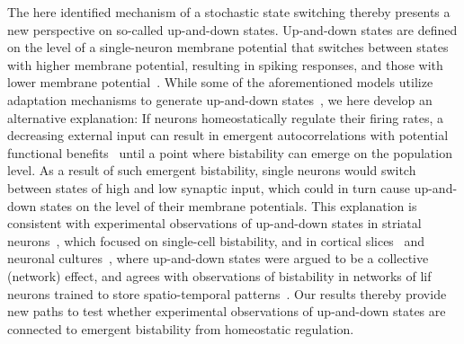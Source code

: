 The here identified mechanism of a stochastic state switching thereby presents a new perspective on so-called up-and-down states.
Up-and-down states are defined on the level of a single-neuron membrane potential that switches between states with higher membrane potential, resulting in spiking responses, and those with lower membrane potential~\cite{wilson_up_2008}.
While some of the aforementioned models utilize adaptation mechanisms to generate up-and-down states~\cite{millman_self-organized_2010,di_santo_self-organized_2016, buendia_self-organized_2020}, we here develop an alternative explanation:
If neurons homeostatically regulate their firing rates, a decreasing external input can result in emergent autocorrelations with potential functional benefits~\cite{zierenberg_homeostatic_2018, cramer_control_2020} until a point where bistability can emerge on the population level.
As a result of such emergent bistability, single neurons would switch between states of high and low synaptic input, which could in turn cause up-and-down states on the level of their membrane potentials.
This explanation is consistent with experimental observations of up-and-down states in striatal neurons~\cite{wilson_up_2008,stern_spontaneous_1997}, which focused on single-cell bistability, and in cortical slices~\cite{cossart_attractor_2003} and neuronal cultures~\cite{vardi_simultaneous_2016}, where up-and-down states were argued to be a collective (network) effect, and agrees with observations of bistability in networks of \gls{lif} neurons trained to store spatio-temporal patterns~\cite{scarpetta_hysteresis_2018}.
Our results thereby provide new paths to test whether experimental observations of up-and-down states are connected to emergent bistability from homeostatic regulation.


